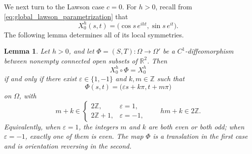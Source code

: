 \documentclass[a4paper,11pt]{amsart}
\numberwithin{equation}{section}
\theoremstyle{plain}
\newtheorem{lem}[thm]{Lemma}
\begin{document}
We next turn to the Lawson case $c=0$. For $h>0$, recall from \eqref{eq:global_lawson_parametrization} that
\[
X_0^h(s,t)=\bigl(\cos s\,e^{iht},\sin s\,e^{it}\bigr).
\]
The following lemma determines all of its local symmetries.

\begin{lem}
\label{lem:lawson_complete_local_symmetry}
Let $h>0$, and let
$
\Phi=(S,T):\Omega\to\Omega'
$
be a $C^1$-diffeomorphism between nonempty connected open subsets of
$\mathbb R^2$. Then
\[
X_0^h\circ\Phi=X_0^h
\]
if and only if there exist
$
\varepsilon\in\{1,-1\}
$
and $k,m\in\mathbb Z$ such that
\begin{equation}\label{eq:lawson_complete_local_symmetry_form}
\Phi(s,t)=\bigl(\varepsilon s+k\pi,t+m\pi\bigr)
\end{equation}
on $\Omega$, with
\begin{equation}\label{eq:lawson_complete_local_symmetry_conditions}
m+k\in
\begin{cases}
2\mathbb Z, & \varepsilon=1,\\
2\mathbb Z+1, & \varepsilon=-1,
\end{cases}
\qquad
hm+k\in2\mathbb Z.
\end{equation}
Equivalently, when $\varepsilon=1$, the integers $m$ and $k$ are
both even or both odd; when $\varepsilon=-1$, exactly one of them is
even. The map $\Phi$ is a translation in the first case and is
orientation reversing in the second.
\end{lem}
\end{document}

